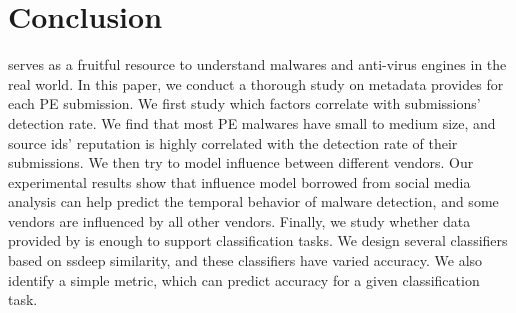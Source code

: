 \section{Conclusion}
\label{sec:con}

\vt{} serves as a fruitful resource to understand malwares and anti-virus engines in the real world. 
In this paper, 
we conduct a thorough study on metadata \vt{} provides for each PE submission. 
We first study which factors correlate with submissions' detection rate. 
We find that most PE malwares have small to medium size, 
and source ids' reputation is highly correlated with the detection rate of their submissions. 
We then try to model influence between different vendors. 
Our experimental results show that   
influence model borrowed from social media analysis can help predict the temporal behavior of malware detection, 
and some vendors are influenced by all other vendors.
Finally, we study whether data provided by \vt{} is enough to support classification tasks. 
We design several classifiers based on ssdeep similarity, and these classifiers have varied accuracy. 
We also identify a simple metric, which can predict accuracy for a given classification
task.